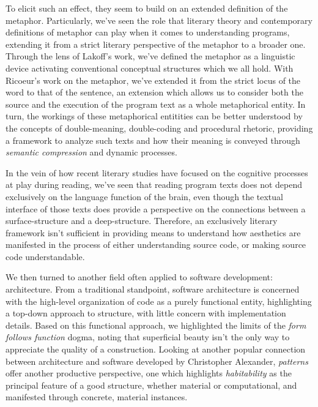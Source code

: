 \documentclass{article}
\begin{document}
To elicit such an effect, they seem to build on an extended definition of the metaphor. Particularly, we've seen the role that literary theory and contemporary definitions of metaphor can play when it comes to understanding programs, extending it from a strict literary perspective of the metaphor to a broader one. Through the lens of Lakoff's work, we've defined the metaphor as a linguistic device activating conventional conceptual structures which we all hold. With Ricoeur's work on the metaphor, we've extended it from the strict locus of the word to that of the sentence, an extension which allows us to consider both the source and the execution of the program text as a whole metaphorical entity. In turn, the workings of these metaphorical entitities can be better understood by the concepts of double-meaning, double-coding and procedural rhetoric, providing a framework to analyze such texts and how their meaning is conveyed through \emph{semantic compression} and dynamic processes.

In the vein of how recent literary studies have focused on the cognitive processes at play during reading, we've seen that reading program texts does not depend exclusively on the language function of the brain, even though the textual interface of those texts does provide a perspective on the connections between a surface-structure and a deep-structure. Therefore, an exclusively literary framework isn't sufficient in providing means to understand how aesthetics are manifested in the process of either understanding source code, or making source code understandable.

We then turned to another field often applied to software development: architecture. From a traditional standpoint, software architecture is concerned with the high-level organization of code as a purely functional entity, highlighting a top-down approach to structure, with little concern with implementation details. Based on this functional approach, we highlighted the limits of the \emph{form follows function} dogma, noting that superficial beauty isn't the only way to appreciate the quality of a construction. Looking at another popular connection between architecture and software developed by Christopher Alexander, \emph{patterns} offer another productive perspective, one which highlights \emph{habitability} as the principal feature of a good structure, whether material or computational, and manifested through concrete, material instances.
\end{document}
